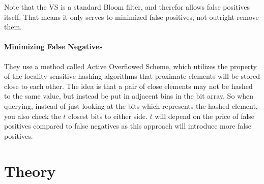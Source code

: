 \documentclass[a4paper,11pt]{article}
\begin{document}
Note that the VS is a standard Bloom filter, and therefor allows false positives itself. That means it only serves to minimized false positives, not outright remove them.

\paragraph{Minimizing False Negatives}
They use a method called Active Overflowed Scheme, which utilizes the property of the locality sensitive hashing algorithms that proximate elements will be stored close to each other. The idea is that a pair of close elements may not be hashed to the same value, but instead be put in adjacent bins in the bit array. So when querying, instead of just looking at the bits which represents the hashed element, you also check the $t$ closest bits to either side. $t$ will depend on the price of false positives compared to false negatives as this approach will introduce more false positives.

\section{Theory} %

\end{document}
